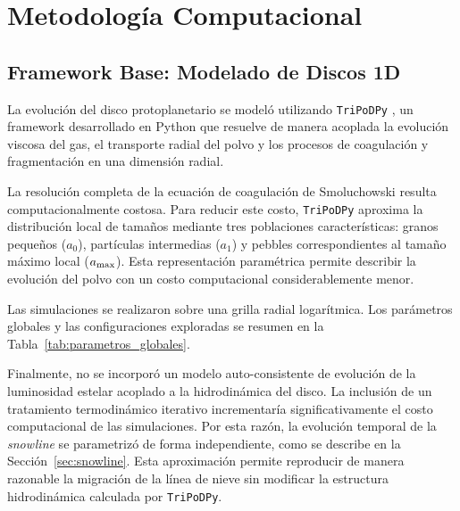 
\chapter{Metodología Computacional}
\label{cap:metodologia}



\section{Framework Base: Modelado de Discos 1D}
\label{sec: tripodpy}
La evolución del disco protoplanetario se modeló utilizando \texttt{TriPoDPy} \citep{Pfeil2024_teoria, Kaufmann2025}, un framework desarrollado en Python que resuelve de manera acoplada la evolución viscosa del gas, el transporte radial del polvo y los procesos de coagulación y fragmentación en una dimensión radial. 


La resolución completa de la ecuación de coagulación de Smoluchowski \citep{Smoluchowski1916} resulta computacionalmente costosa. Para reducir este costo, \texttt{TriPoDPy} \citep{Pfeil2024_teoria, Kaufmann2025} aproxima la distribución local de tamaños mediante tres poblaciones características: granos pequeños ($a_0$), partículas intermedias ($a_1$) y pebbles correspondientes al tamaño máximo local ($a_{\rm max}$). Esta representación paramétrica permite describir la evolución del polvo con un costo computacional considerablemente menor.


Las simulaciones se realizaron sobre una grilla radial logarítmica. Los parámetros globales y las configuraciones exploradas se resumen en la Tabla~\ref{tab:parametros_globales}.



Finalmente, no se incorporó un modelo auto-consistente de evolución de la luminosidad estelar acoplado a la hidrodinámica del disco. La inclusión de un tratamiento termodinámico iterativo incrementaría significativamente el costo computacional de las simulaciones. Por esta razón, la evolución temporal de la \textit{snowline} se parametrizó de forma independiente, como se describe en la Sección~\ref{sec:snowline}. Esta aproximación permite reproducir de manera razonable la migración de la línea de nieve sin modificar la estructura hidrodinámica calculada por \texttt{TriPoDPy}.


